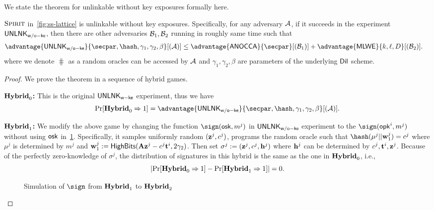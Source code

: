 We state the theorem for unlinkable without key exposures formally here.
\begin{theorem}
\label{thm:unlinkwoke}
$\textsc{Spirit}$ in~\cref{fig:ss-lattice} is unlinkable without key exposures. Specifically, for any adversary $\mathcal{A}$, if it succeeds in the experiment $\mathsf{UNLNK}_\mathsf{w/o-ke}$, then there are other adversaries $\mathcal{B}_1,\mathcal{B}_2$ running in roughly same time such that
\begin{align*}
  \advantage{\unlinkwoke}{\secpar,\hash,\gamma_1,\gamma_2,\beta}[(\Ac)]  &\le \advantage{\anocca}{\secpar}[(\Bc_1)] + \advantage{\mlwe}{k,\ell,D}[(\Bc_2)].
\end{align*}
where we denote $\hash$ as a random oracles can be accessed by $\mathcal{A}$ and $\gamma_1,\gamma_2,\beta$ are parameters of the underlying $\mathsf{Dil}$ scheme.
\end{theorem}
\begin{proof}
We prove the theorem in a sequence of hybrid games.

\noindent\textbf{$\mathbf{Hybrid}_0$:} This is the original $\mathsf{UNLNK}_\mathsf{w-ke}$ experiment, thus we have
$$\Pr[\hyb_0\Rightarrow 1]=\advantage{\unlinkwoke}{\secpar,\hash,\gamma_1,\gamma_2,\beta}[(\Ac)].$$

\noindent\textbf{$\mathbf{Hybrid}_1$:} We modify the above game by changing the function $\sign(\osk,m^j)$ in $\mathsf{UNLNK}_\mathsf{w/o-ke}$ experiment to the $\sign(\opk^i,m^j)$ without using $\mathsf{osk}$ in~\cref{fig:programmed_sign}.  Specifically, it samples uniformly random $(\mathbf{z}^j,c^j)$, programs the random oracle such that $\hash(\mu^j||\wn^j_1)=c^j$ where $\mu^j$ is determined by $m^j$ and $\mathbf{w}^j_1:=\mathsf{HighBits}(\mathbf{A}\mathbf{z}^j-c^j\mathbf{t}^i, 2\gamma_2)$.  Then set $\sigma^j:=(\mathbf{z}^j,c^j,\mathbf{h}^j)$ where $\mathbf{h}^j$ can be determined by $c^j,\mathbf{t}^i,\mathbf{z}^j$. 
Because of the perfectly zero-knowledge of $\sigma^j$, the distribution of signatures in this hybrid is the same as the one in $\mathbf{Hybrid}_0$, i.e.,
$$\left| \Pr[\mathbf{Hybrid}_0\Rightarrow 1]-\Pr[\mathbf{Hybrid}_1\Rightarrow 1] \right| = 0.
$$

\begin{figure}[!t]
    \centering
    \begin{pchstack}[boxed]
    \end{pchstack}
    \caption{Simulation of $\sign$ from $\mathbf{Hybrid}_1$ to $\mathbf{Hybrid}_2$}
    \label{fig:programmed_sign}
\end{figure}



\end{proof}
